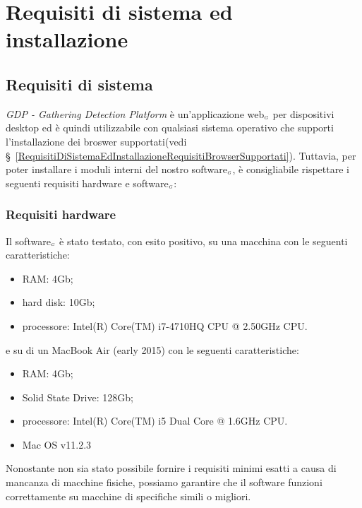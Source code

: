 \chapter{Requisiti di sistema ed installazione}\label{RequisitiDiSistemaEdInstallazione}

\section{Requisiti di sistema}\label{RequisitiDiSistemaEdInstallazioneRequisiti}
\textit{GDP - Gathering Detection Platform} è un'applicazione web$_{\scaleto{G}{3pt}}$ per dispositivi desktop ed è quindi utilizzabile con qualsiasi sistema operativo che supporti l'installazione dei broswer supportati(vedi \S~\ref{RequisitiDiSistemaEdInstallazioneRequisitiBrowserSupportati}). Tuttavia, per poter installare i moduli interni del nostro software$_{\scaleto{G}{3pt}}$, è consigliabile rispettare i seguenti requisiti hardware e software$_{\scaleto{G}{3pt}}$:

\subsection{Requisiti hardware}\label{RequisitiDiSistemaEdInstallazioneRequisitiRequisitiHardware}

Il software$_{\scaleto{G}{3pt}}$ è stato testato, con esito positivo, su una macchina con le seguenti caratteristiche:
\begin{itemize}
	\item RAM: 4Gb;
	\item hard disk: 10Gb;
	\item processore: Intel(R) Core(TM) i7-4710HQ CPU @ 2.50GHz CPU.
\end{itemize}
e su di un MacBook Air (early 2015) con le seguenti caratteristiche:
\begin{itemize}
	\item RAM: 4Gb;
	\item Solid State Drive: 128Gb;
	\item processore: Intel(R) Core(TM) i5 Dual Core @ 1.6GHz CPU.
	\item Mac OS v11.2.3
\end{itemize}

Nonostante non sia stato possibile fornire i requisiti minimi esatti a causa di mancanza di macchine fisiche, possiamo garantire che il software funzioni correttamente su macchine di specifiche simili o migliori.

